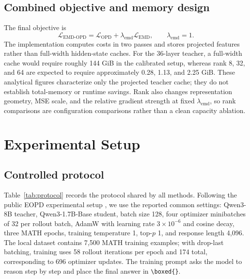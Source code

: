 \documentclass[10pt,twocolumn]{article}
\begin{document}
\subsection{Combined objective and memory design}

The final objective is
\begin{equation}
\mathcal{L}_{\mathrm{EMD\text{-}OPD}}=\mathcal{L}_{\mathrm{OPD}}+
\lambda_{\mathrm{emd}}\mathcal{L}_{\mathrm{EMD}},
\qquad \lambda_{\mathrm{emd}}=1.
\end{equation}
The implementation computes costs in two passes and stores projected features rather than full-width hidden-state caches. For the 36-layer teacher, a full-width cache would require roughly 144 GiB in the calibrated setup, whereas rank 8, 32, and 64 are expected to require approximately 0.28, 1.13, and 2.25 GiB. These analytical figures characterize only the projected teacher cache; they do not establish total-memory or runtime savings. Rank also changes representation geometry, MSE scale, and the relative gradient strength at fixed $\lambda_{\mathrm{emd}}$, so rank comparisons are configuration comparisons rather than a clean capacity ablation.

\section{Experimental Setup}

\subsection{Controlled protocol}

Table~\ref{tab:protocol} records the protocol shared by all methods. Following the public EOPD experimental setup \cite{jin2026eopd}, we use the reported common settings: Qwen3-8B teacher, Qwen3-1.7B-Base student, batch size 128, four optimizer minibatches of 32 per rollout batch, AdamW with learning rate $3\times10^{-6}$ and cosine decay, three MATH epochs, training temperature 1, top-$p$ 1, and response length 4,096. The local dataset contains 7,500 MATH training examples; with drop-last batching, training uses 58 rollout iterations per epoch and 174 total, corresponding to 696 optimizer updates. The training prompt asks the model to reason step by step and place the final answer in \verb|\boxed{}|.
\end{document}
